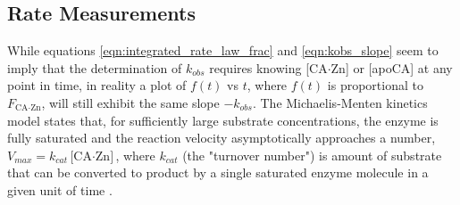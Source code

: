 \subsection{Rate Measurements}
While equations \eqref{eqn:integrated_rate_law_frac} and \eqref{eqn:kobs_slope} seem to imply that the determination of $k_{obs}$ requires knowing [CA$\cdot$Zn] or [apoCA] at any point in time, in reality a plot of $f(t)$ vs $t$, where $f(t)$ is proportional to $F_\text{CA$\cdot$Zn}$, will still exhibit the same slope $-k_{obs}$. The Michaelis-Menten kinetics model states that, for sufficiently large substrate concentrations, the enzyme is fully saturated and the reaction velocity asymptotically approaches a number, $V_{max}=k_{cat}\text{[CA$\cdot$Zn]}$, where $k_{cat}$ (the "turnover number") is amount of substrate that can be converted to product by a single saturated enzyme molecule in a given unit of time \cite{bib:lehninger_mm}. 